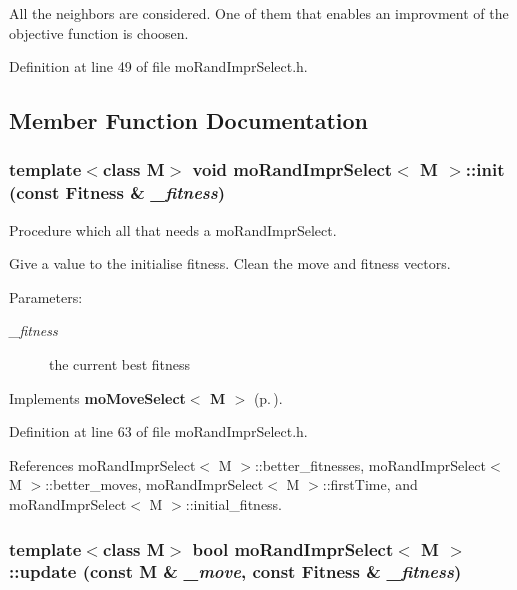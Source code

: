 All the neighbors are considered. One of them that enables an improvment of the objective function is choosen. 



Definition at line 49 of file mo\-Rand\-Impr\-Select.h.

\subsection{Member Function Documentation}
\subsubsection{\setlength{\rightskip}{0pt plus 5cm}template$<$class M$>$ void {\bf mo\-Rand\-Impr\-Select}$<$ M $>$::init (const {\bf Fitness} \& {\em \_\-fitness})\hspace{0.3cm}{\tt  [inline, virtual]}}\label{classmo_rand_impr_select_a0}


Procedure which all that needs a mo\-Rand\-Impr\-Select. 

Give a value to the initialise fitness. Clean the move and fitness vectors.

\begin{Desc}
\item[Parameters:]
\begin{description}
\item[{\em \_\-fitness}]the current best fitness \end{description}
\end{Desc}


Implements {\bf mo\-Move\-Select$<$ M $>$} {\rm (p.\,\pageref{classmo_move_select_a0})}.

Definition at line 63 of file mo\-Rand\-Impr\-Select.h.

References mo\-Rand\-Impr\-Select$<$ M $>$::better\_\-fitnesses, mo\-Rand\-Impr\-Select$<$ M $>$::better\_\-moves, mo\-Rand\-Impr\-Select$<$ M $>$::first\-Time, and mo\-Rand\-Impr\-Select$<$ M $>$::initial\_\-fitness.
\subsubsection{\setlength{\rightskip}{0pt plus 5cm}template$<$class M$>$ bool {\bf mo\-Rand\-Impr\-Select}$<$ M $>$::update (const M \& {\em \_\-move}, const {\bf Fitness} \& {\em \_\-fitness})\hspace{0.3cm}{\tt  [inline, virtual]}}\label{classmo_rand_impr_select_a1}



